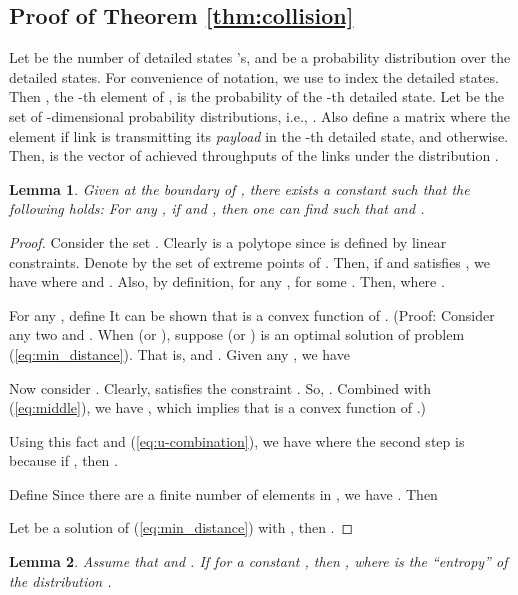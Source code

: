 \documentclass{IEEEtran}
\newtheorem{lemma}{Lemma}
\begin{document}
\subsection{Proof of Theorem \ref{thm:collision}}

Let  be the number of detailed states 's, and 
be a probability distribution over the detailed states. For convenience
of notation, we use  to index the detailed states.
Then , the -th element of , is the probability
of the -th detailed state. Let  be the set of -dimensional
probability distributions, i.e., 
. Also define a  matrix  where the element 
if link  is transmitting its \emph{payload} in the -th detailed
state, and  otherwise. Then,  is the vector
of achieved throughputs of the  links under the distribution .
\begin{lemma}
\label{lem:lip}Given  at the boundary of ,
there exists a constant  such that the following holds: For
any , if  and ,
then one can find  such that 
and .\end{lemma}
\begin{proof}
Consider the set .
Clearly  is a polytope since  is defined by
linear constraints. Denote by  the set of extreme
points of . Then, if  and satisfies
, we have 
where  and .
Also, by definition, for any , 
for some . Then,
where .

For any , define
It can be shown that  is a convex function of .
(Proof: Consider any two  and . When
 (or ), suppose 
(or ) is an optimal solution of problem (\ref{eq:min_distance}).
That is,  and .
Given any , we have 


Now consider . Clearly,
 satisfies
the constraint . So, .
Combined with (\ref{eq:middle}), we have ,
which implies that  is a convex function of .)

Using this fact and (\ref{eq:u-combination}), we have
where the second step is because if , then .

Define 
Since there are a finite number of elements in ,
we have . Then 


Let  be a solution of (\ref{eq:min_distance}) with
, then . \end{proof}
\begin{lemma}
\label{lem:entropy-bound}Assume that 
and . If 
for a constant , then ,
where  is the {}``entropy''
of the distribution .\end{lemma}
\end{document}
